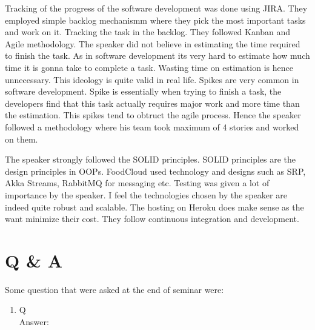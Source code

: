 \documentclass[10pt]{article}
\begin{document}
Tracking of the progress of the software development was done using JIRA. They employed simple backlog mechanismm where they pick the most important tasks and work on it. Tracking the task in the backlog. They followed Kanban and Agile methodology. The speaker did not believe in estimating the time required to finish the task. As in software development its very hard to estimate how much time it is gonna take to complete a task. Wasting time on estimation is hence unnecessary. This ideology is quite valid in real life. Spikes are very common in software development. Spike is essentially when trying to finish a task, the developers find that this task actually requires major work and more time than the estimation. This spikes tend to obtruct the agile process. Hence the speaker followed a methodology where his team took maximum of 4 stories and worked on them. 

The speaker strongly followed the SOLID principles. SOLID principles are the design principles in OOPs. FoodCloud used technology and designs such as SRP, Akka Streams, RabbitMQ for messaging etc. Testing was given a lot of importance by the speaker. I feel the technologies chosen by the speaker are indeed quite robust and scalable. The hosting on Heroku does make sense as the want minimize their cost. They follow continuous integration and development. 

\section{Q \& A}

Some question that were asked at the end of seminar were:

\begin{enumerate}
    \item Q\\
        Answer: 
\end{enumerate}
\end{document}

